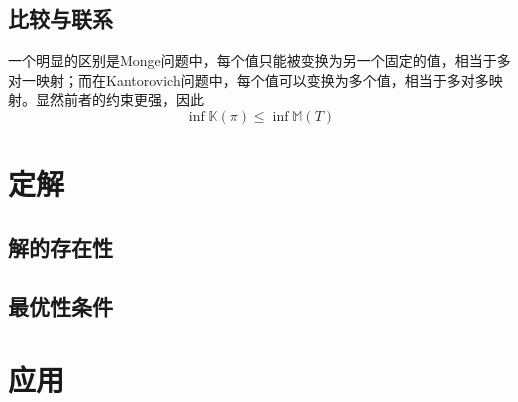 \subsection{比较与联系}
一个明显的区别是Monge问题中，每个值只能被变换为另一个固定的值，相当于多对一映射；而在Kantorovich问题中，每个值可以变换为多个值，相当于多对多映射。显然前者的约束更强，因此
$$\inf \mathbb{K}(\pi)\leq \inf\mathbb{M}(T)$$

\section{定解}
\subsection{解的存在性}

\subsection{最优性条件}

\section{应用}

